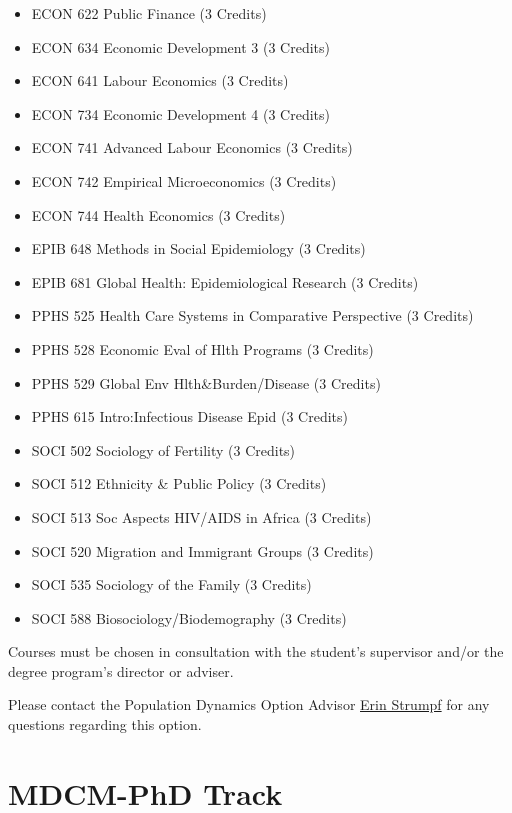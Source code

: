 \documentclass[
  letterpaper,
  DIV=11,
  numbers=noendperiod]{scrreprt}
\providecommand{\tightlist}{%
  \setlength{\itemsep}{0pt}\setlength{\parskip}{0pt}}
\begin{document}
\begin{itemize}
\tightlist
\item
  ECON 622 Public Finance (3 Credits)
\item
  ECON 634 Economic Development 3 (3 Credits)
\item
  ECON 641 Labour Economics (3 Credits)
\item
  ECON 734 Economic Development 4 (3 Credits)
\item
  ECON 741 Advanced Labour Economics (3 Credits)
\item
  ECON 742 Empirical Microeconomics (3 Credits)
\item
  ECON 744 Health Economics (3 Credits)
\item
  EPIB 648 Methods in Social Epidemiology (3 Credits)
\item
  EPIB 681 Global Health: Epidemiological Research (3 Credits)
\item
  PPHS 525 Health Care Systems in Comparative Perspective (3 Credits)
\item
  PPHS 528 Economic Eval of Hlth Programs (3 Credits)
\item
  PPHS 529 Global Env Hlth\&Burden/Disease (3 Credits)
\item
  PPHS 615 Intro:Infectious Disease Epid (3 Credits)
\item
  SOCI 502 Sociology of Fertility (3 Credits)
\item
  SOCI 512 Ethnicity \& Public Policy (3 Credits)
\item
  SOCI 513 Soc Aspects HIV/AIDS in Africa (3 Credits)
\item
  SOCI 520 Migration and Immigrant Groups (3 Credits)
\item
  SOCI 535 Sociology of the Family (3 Credits)
\item
  SOCI 588 Biosociology/Biodemography (3 Credits)
\end{itemize}

Courses must be chosen in consultation with the student's supervisor
and/or the degree program's director or adviser.

Please contact the Population Dynamics Option Advisor
\href{mailto:erin.strumpf@mcgill.ca}{Erin Strumpf} for any questions
regarding this option.


\chapter{MDCM-PhD Track}\label{mdcm-phd-track}
\end{document}
